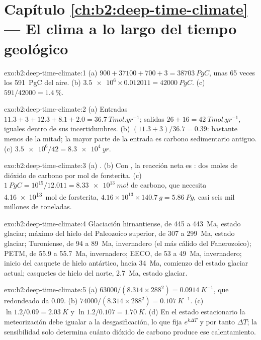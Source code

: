 \section*{Capítulo \ref{ch:b2:deep-time-climate} --- El clima a lo largo del tiempo geológico}

\begin{solution}{exo:b2:deep-time-climate:1}
(a) $900 + 37100 + 700 + 3 = \qty{38703}{PgC}$, unas 65 veces los \qty{591}{PgC} del aire.
(b) $\num{3.5e6}\times0.012011 = \qty{42000}{PgC}$. (c) $591/42000 = \qty{1.4}{\percent}$.
\end{solution}

\begin{solution}{exo:b2:deep-time-climate:2}
(a) Entradas $11.3 + 3 + 12.3 + 8.1 + 2.0 = \qty{36.7}{Tmol.yr^{-1}}$; salidas $26 + 16 =
\qty{42}{Tmol.yr^{-1}}$, iguales dentro de sus incertidumbres. (b) $(11.3 + 3)/36.7 = 0.39$: bastante
menos de la mitad; la mayor parte de la entrada es carbono sedimentario antiguo. (c) $\num{3.5e6}/42 = \qty{8.3e4}{yr}$.
\end{solution}

\begin{solution}{exo:b2:deep-time-climate:3}
(a) . (b) Con , la reacción neta es : dos moles
de dióxido de carbono por mol de forsterita. (c) $\qty{1}{PgC} = 10^{15}/12.011 =
\qty{8.33e13}{mol}$ de carbono, que necesita \qty{4.16e13}{mol} de forsterita, $4.16\times10^{13}
\times\qty{140.7}{g} = \qty{5.86}{Pg}$, casi seis mil millones de toneladas.
\end{solution}

\begin{solution}{exo:b2:deep-time-climate:4}
Glaciación hirnantiense, de 445 a \qty{443}{Ma}, estado glaciar; máximo del hielo del Paleozoico superior, de 307 a
\qty{299}{Ma}, estado glaciar; Turoniense, de 94 a \qty{89}{Ma}, invernadero (el más cálido del Fanerozoico);
PETM, de 55.9 a \qty{55.7}{Ma}, invernadero; EECO, de 53 a \qty{49}{Ma}, invernadero; inicio del casquete de hielo
antártico, hacia \qty{34}{Ma}, comienzo del estado glaciar actual; casquetes de hielo del norte,
\qty{2.7}{Ma}, estado glaciar.
\end{solution}

\begin{solution}{exo:b2:deep-time-climate:5}
(a) $63000/(8.314\times288^2) = \qty{0.0914}{K^{-1}}$, que redondeado da 0.09. (b) $74000/(8.314
\times288^2) = \qty{0.107}{K^{-1}}$. (c) $\ln1.2/0.09 = \qty{2.03}{K}$ y $\ln 1.2/0.107 =
\qty{1.70}{K}$. (d) En el estado estacionario la meteorización debe igualar a la desgasificación, lo que fija $e^{k
\Delta T}$ y por tanto $\Delta T$; la sensibilidad solo determina cuánto dióxido de carbono produce ese
calentamiento.
\end{solution}


